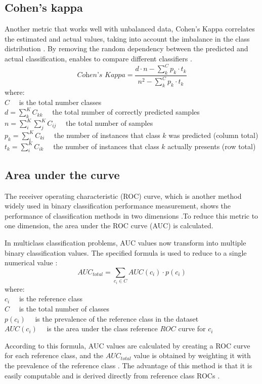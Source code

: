 \subsection{Cohen's kappa}
Another metric that works well with unbalanced data, Cohen's Kappa correlates the estimated and actual values, taking into account the imbalance in the class distribution \cite{maaritwidmannalfredoroccato2021}. By removing the random dependency between the predicted and actual classification, enables to compare different classifiers \cite{grandini2020metrics}. 
\begin{equation}
\textit{Cohen's Kappa} = \displaystyle\frac{d \cdot n-\displaystyle\sum_{k}^{C} p_{k} \cdot t_{k}}{n^{2}-\displaystyle\sum_{k}^{C} p_{k} \cdot t_{k}}
\label{kappa}	
\end{equation}
where:\\
$C\quad$ is the total number classes\\
$d=\displaystyle\sum_{k}^{K} C_{k k} \quad$ the total number of correctly predicted samples\\
$n=\displaystyle\sum_{i}^{K} \displaystyle\sum_{j}^{K} C_{i j}\quad$ the total number of samples\\
$p_{k}=\displaystyle\sum_{i}^{K} C_{k i}\quad$ the number of instances that class $k$ was predicted (column total)\\
$t_{k}=\displaystyle\sum_{i}^{K} C_{i k}\quad$ the number of instances that class $k$ actually presents (row total)

\subsection{Area under the curve}
The receiver operating characteristic (ROC) curve, which is another method widely used in binary classification performance measurement, shows the performance of classification methods in two dimensions \cite{fawcett2004roc}.To reduce this metric to one dimension, the area under the ROC curve (AUC) is calculated.

In multiclass classification problems, AUC values now transform into multiple binary classification values. The specified formula is used to reduce to a single numerical value \cite{fawcett2004roc}:
\begin{equation}
\textit{AUC}_{total} = \displaystyle\sum_{c_{i} \in C} AUC(c_{i}) \cdot p(c_{i})
\label{auc}
\end{equation}
where:\\
$c_{i} \quad$ is the reference class \\
$C \quad$ is the total number of classes\\
$p(c_i) \quad$ is the prevalence of the reference class in the dataset\\
$AUC(c_{i}) \quad$ is the area under the class reference $ROC$ curve for $c_{i}$

According to this formula, AUC values are calculated by creating a ROC curve for each reference class, and the $AUC_{total}$ value is obtained by weighting it with the prevalence of the reference class \cite{fawcett2004roc,he2009learning}. The advantage of this method is that it is easily computable and is derived directly from reference class ROCs \cite{fawcett2004roc}.